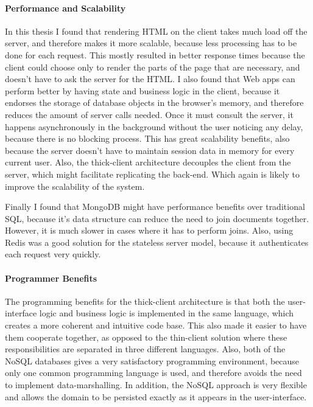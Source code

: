 \paragraph{Performance and Scalability}
In this thesis I found that rendering HTML on the client takes much load off the server, and therefore makes it more scalable, because less processing has to be done for each request. This mostly resulted in better response times because the client could choose only to render the parts of the page that are necessary, and doesn't have to ask the server for the HTML. I also found that Web apps can perform better by having state and business logic in the client, because it endorses the storage of database objects in the browser's memory, and therefore reduces the amount of server calls needed. Once it must consult the server, it happens asynchronously in the background without the user noticing any delay, because there is no blocking process. This has great scalability benefits, also because the server doesn't have to maintain session data in memory for every current user. Also, the thick-client architecture decouples the client from the server, which might facilitate replicating the back-end. Which again is likely to improve the scalability of the system.

Finally I found that MongoDB might have performance benefits over traditional SQL, because it's data structure can reduce the need to join documents together. However, it is much slower in cases where it has to perform joins. Also, using Redis was a good solution for the stateless server model, because it authenticates each request very quickly. 

\paragraph{Programmer Benefits}
The programming benefits for the thick-client architecture is that both the user-interface logic and business logic is implemented in the same language, which creates a more coherent and intuitive code base. This also made it easier to have them cooperate together, as opposed to the thin-client solution where these responsibilities are separated in three different languages. Also, both of the NoSQL databases gives a very satisfactory programming environment, because only one common programming language is used, and therefore avoids the need to implement data-marshalling. In addition, the NoSQL approach is very flexible and allows the domain to be persisted exactly as it appears in the user-interface.

